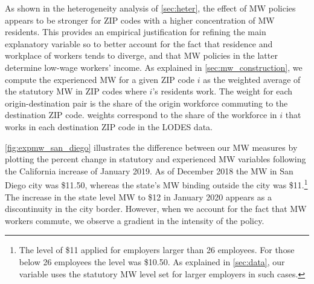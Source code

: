 As shown in the heterogeneity analysis of \autoref{sec:heter}, the effect of MW policies 
appears to be stronger for ZIP codes with a higher concentration of MW residents. This 
provides an empirical justification for refining the main explanatory variable so to 
better account for the fact that residence and workplace of workers tends to diverge, 
and that MW policies in the latter determine low-wage workers' income. As explained in 
\autoref{sec:mw_construction}, we compute the experienced MW for a given ZIP code $i$ as 
the weighted average of the statutory MW in ZIP codes where $i$'s residents  work.
The weight for each origin-destination pair is the share of the origin workforce commuting to
the destination ZIP code. weights correspond to the share of the workforce in $i$ that works in 
each destination ZIP code in the LODES data.

\autoref{fig:expmw_san_diego} illustrates the difference between our MW measures by plotting 
the percent change in statutory and experienced MW variables following the California 
increase of January 2019. As of December 2018 the MW in San Diego city was \$11.50, whereas 
the state's MW binding outside the city was \$11.\footnote{The level of \$11 applied for 
	employers larger than 26 employees. For those below 26 employees the level was \$10.50. 
	As explained in 	\autoref{sec:data}, our variable uses the statutory MW level set for 
	larger employers in such cases.}
The increase in the state level MW to \$12 in January 2020 appears as a discontinuity in the 
city border. However, when we account for the fact that MW workers commute, we observe a 
gradient in the intensity of the policy.

